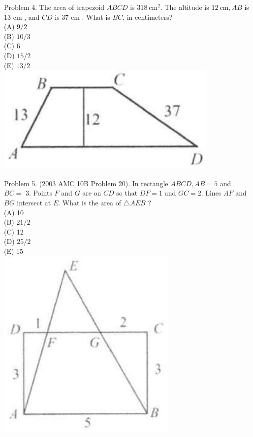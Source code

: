 \documentclass[10pt]{article}
\begin{document}
Problem 4. The area of trapezoid \(A B C D\) is \(318 \mathrm{~cm}^{2}\). The altitude is \(12 \mathrm{~cm}, A B\) is 13 cm , and \(C D\) is 37 cm . What is \(B C\), in centimeters?\\
(A) \(9 / 2\)\\
(B) \(10 / 3\)\\
(C) 6\\
(D) \(15 / 2\)\\
(E) \(13 / 2\)\\
\includegraphics[max width=\textwidth, center]{2025_04_17_97bc1f7e44d93c271a88g-088}

Problem 5. (2003 AMC 10B Problem 20). In rectangle \(A B C D, A B=5\) and \(B C=\) 3. Points \(F\) and \(G\) are on \(C D\) so that \(D F=1\) and \(G C=2\). Lines \(A F\) and \(B G\) intersect at \(E\). What is the area of \(\triangle A E B\) ?\\
(A) 10\\
(B) \(21 / 2\)\\
(C) 12\\
(D) \(25 / 2\)\\
(E) 15\\
\includegraphics[max width=\textwidth, center]{2025_04_17_97bc1f7e44d93c271a88g-088(2)}
\end{document}
